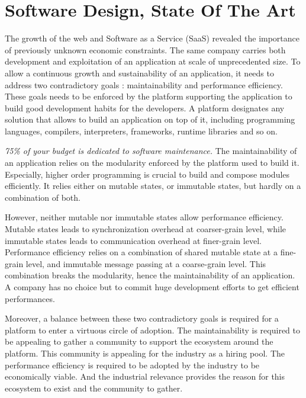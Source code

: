 \chapter{Software Design, State Of The Art} \label{chapter3}
\minitoc
\eject


The growth of the web and Software as a Service (SaaS) revealed the importance of previously unknown economic constraints.
The same company carries both development and exploitation of an application at scale of unprecedented size.
To allow a continuous growth and sustainability of an application, it needs to address two contradictory goals : maintainability and performance efficiency.
These goals needs to be enforced by the platform supporting the application to build good development habits for the developers.
A platform designates any solution that allows to build an application on top of it, including programming languages, compilers, interpreters, frameworks, runtime libraries and so on.

\textit{75\% of your budget is dedicated to software maintenance.}
The maintainability of an application relies on the modularity enforced by the platform used to build it.
Especially, higher order programming is crucial to build and compose modules efficiently.
It relies either on mutable states, or immutable states, but hardly on a combination of both.

However, neither mutable nor immutable states allow performance efficiency.
Mutable states leads to synchronization overhead at coarser-grain level, while immutable states leads to communication overhead at finer-grain level.
Performance efficiency relies on a combination of shared mutable state at a fine-grain level, and immutable message passing at a coarse-grain level.
This combination breaks the modularity, hence the maintainability of an application.
A company has no choice but to commit huge development efforts to get efficient performances.

Moreover, a balance between these two contradictory goals is required for a platform to enter a virtuous circle of adoption.
The maintainability is required to be appealing to gather a community to support the ecosystem around the platform.
This community is appealing for the industry as a hiring pool.
The performance efficiency is required to be adopted by the industry to be economically viable.
And the industrial relevance provides the reason for this ecosystem to exist and the community to gather.

